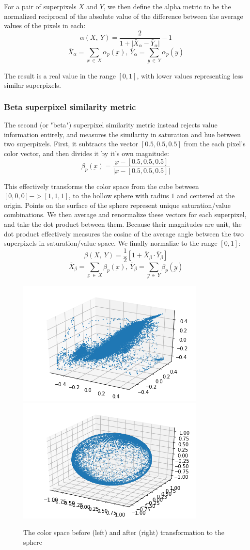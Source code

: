 \documentclass[twocolumn]{article}
\begin{document}
For a pair of superpixels $X$ and $Y$, we then define the alpha metric to be the normalized reciprocal of the absolute value of the difference between the average values of the pixels in each:
\[
    \alpha(X,\: Y) = \frac{2}{1 + \lvert \bar{X}_\alpha - \bar{Y}_\alpha \rvert} - 1
\]
\[
    \bar{X}_\alpha = \sum\limits_{\underbar{x}\: \in\: X} \alpha_p(\underbar{x}),\ \bar{Y}_\alpha = \sum\limits_{\underbar{y}\: \in\: Y} \alpha_p(\underbar{y})
\]

The result is a real value in the range $[0, 1]$, with lower values representing less similar superpixels.

\subsubsection{Beta superpixel similarity metric}

The second (or "beta") superpixel similarity metric instead rejects value information entirely, and measures the similarity in saturation and hue between two superpixels. First, it subtracts the vector $[0.5, 0.5, 0.5]$ from the each pixel's color vector, and then divides it by it's own magnitude:
\[
    \beta_p(\underbar{x}) = \frac{\underbar{x} - [0.5, 0.5, 0.5]}{\lvert \underbar{x} - [0.5, 0.5, 0.5] \rvert}
\]

This effectively transforms the color space from the cube between $[0, 0, 0] -> [1, 1, 1]$, to the hollow sphere with radius $1$ and centered at the origin. Points on the surface of the sphere represent unique saturation/value combinations. We then average and renormalize these vectors for each superpixel, and take the dot product between them. Because their magnitudes are unit, the dot product effectively measures the cosine of the average angle between the two superpixels in saturation/value space. We finally normalize to the range $[0, 1]$:
\[
    \beta(X,\: Y) = \frac{1}{2}[1 + \bar{X}_\beta \cdot \bar{Y}_\beta]
\]
\[
    \bar{X}_\beta = \sum\limits_{\underbar{x}\: \in\: X} \beta_p(\underbar{x}),\ \bar{Y}_\beta = \sum\limits_{\underbar{y}\: \in\: Y} \beta_p(\underbar{y})
\]

\begin{figure}[h]
  \centering
  \includegraphics[width=0.45\linewidth]{figs/cloud.png}
  \includegraphics[width=0.45\linewidth]{figs/sphere.png}
  \caption{
    The color space before (left) and after (right) transformation to the sphere
  }
\end{figure}
\end{document}
